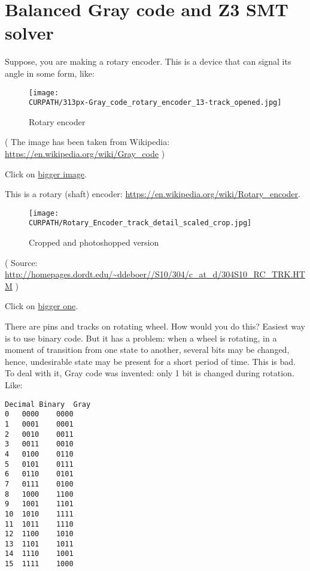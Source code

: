\section{Balanced Gray code and Z3 SMT solver}
\label{Gray_Z3}

\renewcommand{\CURPATH}{gray_code/SMT}

Suppose, you are making a rotary encoder.
This is a device that can signal its angle in some form, like:

\begin{figure}[H]
\centering
\texttt{[image: \\CURPATH/313px-Gray\_code\_rotary\_encoder\_13-track\_opened.jpg]}
\caption{Rotary encoder}
\end{figure}

( The image has been taken from Wikipedia: \url{https://en.wikipedia.org/wiki/Gray_code} )

Click on \href{https://github.com/DennisYurichev/SAT_SMT_by_example/blob/master/gray_code/SMT/Gray_code_rotary_encoder_13-track_opened.jpg}{bigger image}.

This is a rotary (shaft) encoder: \url{https://en.wikipedia.org/wiki/Rotary_encoder}.

\begin{figure}[H]
\centering
\texttt{[image: \\CURPATH/Rotary\_Encoder\_track\_detail\_scaled\_crop.jpg]}
\caption{Cropped and photoshopped version}
\end{figure}

( Source: \url{http://homepages.dordt.edu/~ddeboer//S10/304/c_at_d/304S10_RC_TRK.HTM} )

Click on
\href{https://github.com/DennisYurichev/SAT_SMT_by_example/blob/master/gray_code/SMT/Rotary_Encoder_track_detail.jpg}{bigger one}.

There are pins and tracks on rotating wheel.
How would you do this?
Easiest way is to use binary code.
But it has a problem: when a wheel is rotating, in a moment of transition from one state to another, several bits may be changed, hence, undesirable state may be present for a short period of time.
This is bad.
To deal with it, Gray code was invented: only 1 bit is changed during rotation.
Like:

\begin{lstlisting}
Decimal Binary  Gray
0 	0000 	0000
1 	0001 	0001
2 	0010 	0011
3 	0011 	0010
4 	0100 	0110
5 	0101 	0111
6 	0110 	0101
7 	0111 	0100
8 	1000 	1100
9 	1001 	1101
10 	1010 	1111
11 	1011 	1110
12 	1100 	1010
13 	1101 	1011
14 	1110 	1001
15 	1111 	1000
\end{lstlisting}


